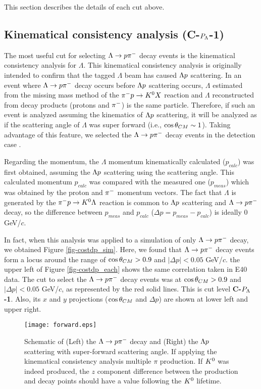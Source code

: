 This section describes the details of each cut above.

\subsection{Kinematical consistency analysis ({\bf C-$P_{\Lambda}$-1})}
\label{sec-Pl-kinema}

The most useful cut for selecting $\Lambda\to p\pi^{-}$ decay events is the kinematical consistency analysis for $\Lambda$. This kinematical consistency analysis is originally intended to confirm that the tagged $\Lambda$ beam has caused $\Lambda p$ scattering. In an event where $\Lambda\to p\pi^{-}$ decay occurs before $\Lambda p$ scattering occurs, $\Lambda$ estimated from the missing mass method of the $\pi^- p \to K^0 X$ reaction and $\Lambda$ reconstructed from decay products (protons and $\pi^{-}$) is the same particle. Therefore, if such an event is analyzed assuming the kinematics of $\Lambda p$ scattering, it will be analyzed as if the scattering angle of $\Lambda$ was super forward (i.e., $\cos{\theta}_{CM} \sim 1$). Taking advantage of this feature, we selected the $\Lambda\to p\pi^{-}$ decay events in the detection case .

Regarding the momentum, the $\Lambda$ momentum kinematically calculated ($p_{calc}$) was first obtained, assuming the $\Lambda p$ scattering using the scattering angle. This calculated momentum $p_{calc}$ was compared with the measured one ($p_{meas}$) which was obtained by the proton and $\pi^{-}$ momentum vectors. The fact that $\Lambda$ is generated by the $\pi^- p \to K^0 \Lambda$ reaction is common to $\Lambda p$ scattering and $\Lambda\to p\pi^{-}$ decay, so the difference between $p_{meas}$ and $p_{calc}$ ($\Delta p = p_{meas} - p_{calc}$) is ideally 0 GeV/$c$.

In fact, when this analysis was applied to a simulation of only $\Lambda\to p\pi^{-}$ decay, we obtained Figure \ref{fig-costdp_sim}. Here, we found that $\Lambda\to p\pi^{-}$ decay events form a locus around the range of $\cos{\theta}_{CM}>0.9$ and $|\Delta p| < 0.05$ GeV/$c$. the upper left of Figure \ref{fig-costdp_each} shows the same correlation taken in E40 data. The cut to select the $\Lambda\to p\pi^{-}$ decay events was at $\cos{\theta}_{CM}>0.9$ and $|\Delta p| < 0.05$ GeV/$c$, as represented by the red solid lines. This is cut level {\bf C-$P_{\Lambda}$-1}. Also, its $x$ and $y$ projections ($\cos{\theta}_{CM}$ and $\Delta p$) are shown at lower left and upper right.

\begin{figure}[h]
  \centering
  \texttt{[image: forward.eps]}
  \caption{Schematic of (Left) the $\Lambda\to p\pi^{-}$ decay and (Right) the $\Lambda p$ scattering with super-forward scattering angle. If applying the kinematical consistency analysis 
  multiple $\pi$ production. If $K^{0}$ was indeed produced, the $z$ component difference between the production and decay points should have a value following the $K^{0}$ lifetime.}
  \label{fig-forward}
\end{figure}

